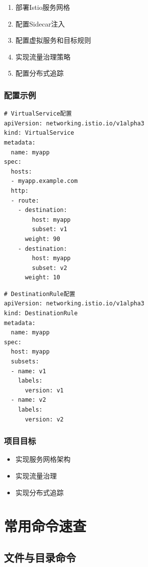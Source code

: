 \documentclass[12pt,UTF8]{ctexbook}
\begin{document}
\begin{enumerate}
    \item 部署Istio服务网格
    \item 配置Sidecar注入
    \item 配置虚拟服务和目标规则
    \item 实现流量治理策略
    \item 配置分布式追踪
\end{enumerate}

\subsection*{配置示例}

\begin{lstlisting}
# VirtualService配置
apiVersion: networking.istio.io/v1alpha3
kind: VirtualService
metadata:
  name: myapp
spec:
  hosts:
  - myapp.example.com
  http:
  - route:
    - destination:
        host: myapp
        subset: v1
      weight: 90
    - destination:
        host: myapp
        subset: v2
      weight: 10
\end{lstlisting}

\begin{lstlisting}
# DestinationRule配置
apiVersion: networking.istio.io/v1alpha3
kind: DestinationRule
metadata:
  name: myapp
spec:
  host: myapp
  subsets:
  - name: v1
    labels:
      version: v1
  - name: v2
    labels:
      version: v2
\end{lstlisting}

\subsection*{项目目标}

\begin{itemize}
    \item 实现服务网格架构
    \item 实现流量治理
    \item 实现分布式追踪
\end{itemize}

\chapter{常用命令速查}
\label{chap:command-reference}

\section{文件与目录命令}
\label{sec:file-commands}
\end{document}
